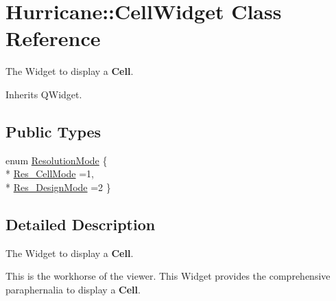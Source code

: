 \hypertarget{classHurricane_1_1CellWidget}{\section{Hurricane\-:\-:Cell\-Widget Class Reference}
\label{classHurricane_1_1CellWidget}
}


The Widget to display a {\bf Cell}.  




Inherits Q\-Widget.

\subsection*{Public Types}
\begin{DoxyCompactItemize}
\item 
enum \hyperlink{classHurricane_1_1CellWidget_a4b81fed78775d491c169b649870d9dd7}{Resolution\-Mode} \{ \\*
\hyperlink{classHurricane_1_1CellWidget_a4b81fed78775d491c169b649870d9dd7af37fd1c10fd363f0ad04a94dbccd5789}{Res\-\_\-\-Cell\-Mode} =1, 
\\*
\hyperlink{classHurricane_1_1CellWidget_a4b81fed78775d491c169b649870d9dd7a0c7c9bd939930fe178b5b8bcd84bdc1e}{Res\-\_\-\-Design\-Mode} =2
 \}
\end{DoxyCompactItemize}


\subsection{Detailed Description}
The Widget to display a {\bf Cell}. 

This is the workhorse of the viewer. This Widget provides the comprehensive paraphernalia to display a {\bf Cell}. 

